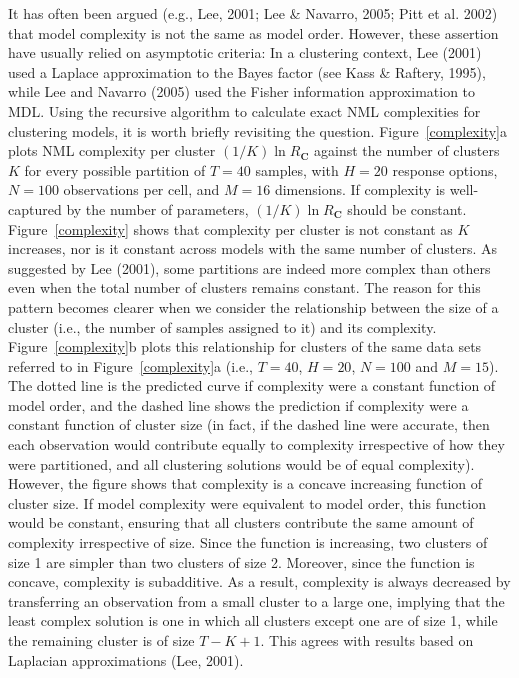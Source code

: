 \documentclass{elsart}
\begin{document}
It has often been argued (e.g., Lee, 2001; Lee \& Navarro, 2005; Pitt et al. 2002) that model
complexity is not the same as model order. However, these assertion have usually relied on
asymptotic criteria: In a clustering context, Lee (2001) used a Laplace approximation to the Bayes
factor (see Kass \& Raftery, 1995), while Lee and Navarro (2005) used the Fisher information
approximation to MDL. Using the recursive algorithm to calculate exact NML complexities for
clustering models, it is worth briefly revisiting the question. Figure~\ref{complexity}a plots NML
complexity per cluster $(1/K)\ln{R}_{\bm{C}}$ against the number of clusters $K$ for every
possible partition of $T=40$ samples, with $H=20$ response options, $N=100$ observations per cell,
and $M=16$ dimensions. If complexity is well-captured by the number of parameters,
$(1/K)\ln{R}_{\bm{C}}$ should be constant. Figure~\ref{complexity} shows that complexity per
cluster is not constant as $K$ increases, nor is it constant across models with the same number of
clusters. As suggested by Lee (2001), some partitions are indeed more complex than others even
when the total number of clusters remains constant. The reason for this pattern becomes clearer
when we consider the relationship between the size of a cluster (i.e., the number of samples
assigned to it) and its complexity. Figure~\ref{complexity}b plots this relationship for clusters
of the same data sets referred to in Figure~\ref{complexity}a (i.e., $T=40$, $H=20$, $N=100$ and
$M=15$). The dotted line is the predicted curve if complexity were a constant function of model
order, and the dashed line shows the prediction if complexity were a constant function of cluster
size (in fact, if the dashed line were accurate, then each observation would contribute equally to
complexity irrespective of how they were partitioned, and all clustering solutions would be of
equal complexity). However, the figure shows that complexity is a concave increasing function of
cluster size. If model complexity were equivalent to model order, this function would be constant,
ensuring that all clusters contribute the same amount of complexity irrespective of size. Since
the function is increasing, two clusters of size 1 are simpler than two clusters of size 2.
Moreover, since the function is concave, complexity is subadditive. As a result, complexity is
always decreased by transferring an observation from a small cluster to a large one, implying that
the least complex solution is one in which all clusters except one are of size 1, while the
remaining cluster is of size $T-K+1$. This agrees with results based on Laplacian approximations
(Lee, 2001).
\end{document}
